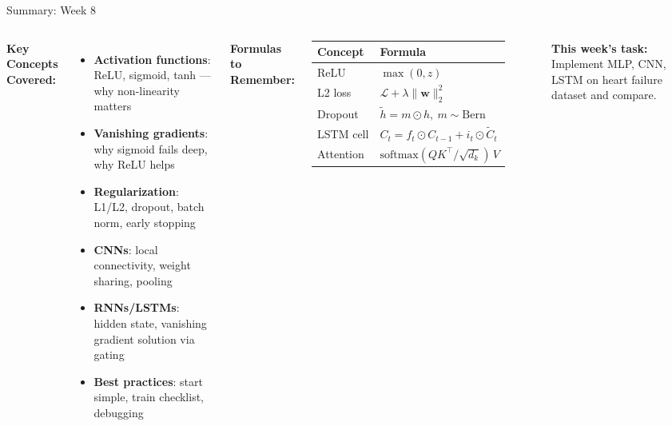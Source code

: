 \documentclass[aspectratio=169]{beamer}
\begin{document}
\begin{frame}{Summary: Week 8}

\begin{columns}
\textbf{Key Concepts Covered:}

\vspace{0.2cm}
\begin{itemize}
    \item[\checkmark] \textbf{Activation functions}: ReLU, sigmoid, tanh --- why non-linearity matters
    \item[\checkmark] \textbf{Vanishing gradients}: why sigmoid fails deep, why ReLU helps
    \item[\checkmark] \textbf{Regularization}: L1/L2, dropout, batch norm, early stopping
    \item[\checkmark] \textbf{CNNs}: local connectivity, weight sharing, pooling
    \item[\checkmark] \textbf{RNNs/LSTMs}: hidden state, vanishing gradient solution via gating
    \item[\checkmark] \textbf{Best practices}: start simple, train checklist, debugging
\end{itemize}

\textbf{Formulas to Remember:}

\vspace{0.2cm}
\begin{tabular}{@{}ll@{}}
\toprule
\textbf{Concept} & \textbf{Formula} \\
\midrule
ReLU & $\max(0, z)$ \\
L2 loss & $\mathcal{L} + \lambda\|\mathbf{w}\|_2^2$ \\
Dropout & $\tilde{h} = m \odot h,\ m \sim \text{Bern}$ \\
LSTM cell & $C_t = f_t \odot C_{t-1} + i_t \odot \tilde{C}_t$ \\
Attention & $\text{softmax}(QK^\top/\sqrt{d_k})\,V$ \\
\bottomrule
\end{tabular}

\vspace{0.4cm}
\textbf{This week's task:} Implement MLP, CNN, LSTM on heart failure dataset and compare.
\end{columns}
\end{frame}
\end{document}
